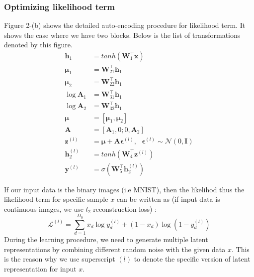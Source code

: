 \subsubsection{Optimizing likelihood term}
Figure 2-(b) shows the detailed auto-encoding procedure for likelihood term. It shows the case where we have two blocks. Below is the list of transformations denoted by this figure.
\begin{align}
\mathbf{h}_1&=tanh(\mathbf{W}_1^{\top}\mathbf{x})\\
\mathbf{\mu}_1&=\mathbf{W}_{21}^{\top}\mathbf{h}_1\\
\mathbf{\mu}_2&=\mathbf{W}_{22}^{\top}\mathbf{h}_1\\
\log \mathbf{A}_1 &= \mathbf{W}_{31}^{\top}\mathbf{h}_1\\
\log \mathbf{A}_2 &= \mathbf{W}_{32}^{\top}\mathbf{h}_1\\
\mathbf{\mu} &= [\mathbf{\mu}_1, \mathbf{\mu}_2] \\
\mathbf{A} &= [\mathbf{A}_1, 0; 0, \mathbf{A}_2] \\
\mathbf{z}^{(l)}&=\mathbf{\mu} + \mathbf{A} \mathbf{\epsilon}^{(l)}, ~~~\mathbf{\epsilon}^{(l)} \sim \mathcal{N}(0, \mathbf{I})\\
\mathbf{h}_2^{(l)} &= tanh(\mathbf{W}_4^{\top}\mathbf{z}^{(l)})\\
\mathbf{y}^{(l)} &= \sigma(\mathbf{W}_5^{\top}\mathbf{h}_2^{(l)})
\end{align}


If our input data is the binary images (i.e MNIST), then the likelihod  thus the likelihood term for specific sample $x$ can be written as (if input data is continuous images, we use $l_2$ reconstruction loss) :
\[
\mathcal{L}^{(l)} = \sum_{d=1}^{D_0}x_d\log y_d^{(l)}+(1-x_d)\log(1-y_d^{(l)})
\]
During the learning procedure, we need to generate multiple latent representations by combining different random noise with the given data $x$. This is the reason why we use superscript $(l)$ to denote the specific version of latent representation for input $x$.

